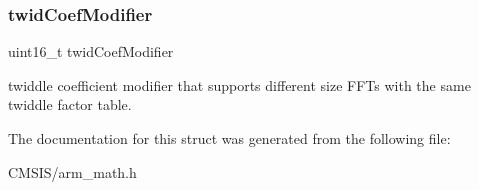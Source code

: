 \subsubsection{\texorpdfstring{twidCoefModifier}{twidCoefModifier}}
{\footnotesize\ttfamily uint16\+\_\+t twid\+Coef\+Modifier}

twiddle coefficient modifier that supports different size F\+F\+Ts with the same twiddle factor table. 

The documentation for this struct was generated from the following file\+:\begin{DoxyCompactItemize}
\item 
C\+M\+S\+I\+S/arm\+\_\+math.\+h\end{DoxyCompactItemize}
